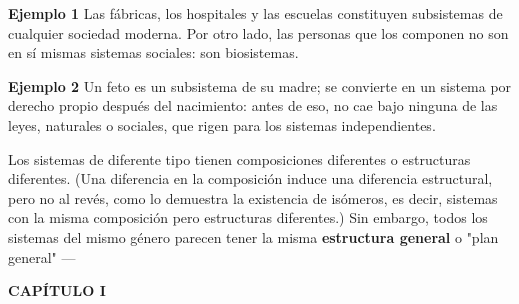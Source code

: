 {\textbf{Ejemplo 1} Las fábricas, los hospitales y las escuelas constituyen subsistemas de cualquier sociedad moderna. Por otro lado, las personas que los componen no son en sí mismas sistemas sociales: son biosistemas.

\textbf{Ejemplo 2} Un feto es un subsistema de su madre; se convierte en un sistema por derecho propio después del nacimiento: antes de eso, no cae bajo ninguna de las leyes, naturales o sociales, que rigen para los sistemas independientes.

Los sistemas de diferente tipo tienen composiciones diferentes o estructuras diferentes. (Una diferencia en la composición induce una diferencia estructural, pero no al revés, como lo demuestra la existencia de isómeros, es decir, sistemas con la misma composición pero estructuras diferentes.) Sin embargo, todos los sistemas del mismo género parecen tener la misma \textbf{estructura general} o "plan general" —

}
\newpage
\fancyhf{}
\fancyhead[l]{\thepage} 
\begin{center}
{\fontsize{13}{16}\selectfont \textbf{CAPÍTULO I}}
\end{center}
\vspace{0.5cm}


